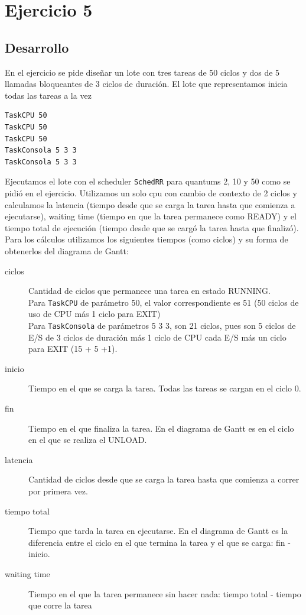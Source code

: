 \section{Ejercicio 5}


\subsection{Desarrollo}
En el ejercicio se pide diseñar un lote con tres tareas de 50 ciclos y dos de 5 llamadas bloqueantes de 3 ciclos de duración. El lote que representamos inicia todas las tareas a la vez
\begin{verbatim}
TaskCPU 50
TaskCPU 50
TaskCPU 50
TaskConsola 5 3 3
TaskConsola 5 3 3
\end{verbatim}
Ejecutamos el lote con el scheduler \verb|SchedRR| para quantums 2, 10 y 50 como se pidió en el ejercicio. Utilizamos un solo cpu con cambio de contexto de 2 ciclos y  calculamos la latencia (tiempo desde que se carga la tarea hasta que comienza a ejecutarse), waiting time (tiempo en que la tarea permanece como READY) y el tiempo total de ejecución (tiempo desde que se cargó la tarea hasta que finalizó).  Para los cálculos utilizamos los siguientes tiempos (como ciclos) y su forma de obtenerlos del diagrama de Gantt:
\begin{description}
\item[ciclos] Cantidad de ciclos que permanece una tarea en estado RUNNING.\\
Para \verb|TaskCPU| de parámetro 50, el valor correspondiente es 51 (50 ciclos de uso de CPU más 1 ciclo para EXIT)\\
Para \verb|TaskConsola| de parámetros 5 3 3, son 21 ciclos, pues son 5 ciclos de E/S de 3 ciclos de duración más 1 ciclo de CPU cada E/S más un ciclo para EXIT (15 + 5 +1).
\item[inicio] Tiempo en el que se carga la tarea. Todas las tareas se cargan en el ciclo 0.
\item[fin] Tiempo en el que finaliza la tarea. En el diagrama de Gantt es en el ciclo en el que se realiza el UNLOAD.
\item[latencia] Cantidad de ciclos desde que se carga la tarea hasta que comienza a correr por primera vez.
\item[tiempo total] Tiempo que tarda la tarea en ejecutarse. En el diagrama de Gantt es la diferencia entre el ciclo en el que termina la tarea y el que se carga: fin - inicio.
\item[waiting time] Tiempo en el que la tarea permanece sin hacer nada: tiempo total - tiempo que corre la tarea
\end{description}
